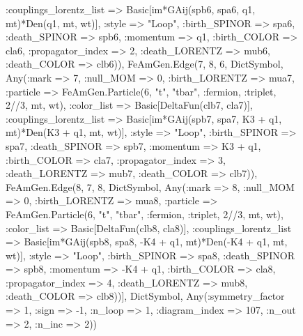 \documentclass{revtex4}
\begin{document}
\begin{figure}[!htb]
\begin{center}
{:couplings_lorentz_list => Basic[im*GAij(spb6, spa6, q1, mt)*Den(q1, mt, wt)], :style => "Loop", :birth_SPINOR => spa6, :death_SPINOR => spb6, :momentum => q1, :birth_COLOR => cla6, :propagator_index => 2, :death_LORENTZ => mub6, :death_COLOR => clb6)), FeAmGen.Edge(7, 8, 6, Dict{Symbol, Any}(:mark => 7, :null_MOM => 0, :birth_LORENTZ => mua7, :particle => FeAmGen.Particle(6, "t", "tbar", :fermion, :triplet, 2//3, mt, wt), :color_list => Basic[DeltaFun(clb7, cla7)], :couplings_lorentz_list => Basic[im*GAij(spb7, spa7, K3 + q1, mt)*Den(K3 + q1, mt, wt)], :style => "Loop", :birth_SPINOR => spa7, :death_SPINOR => spb7, :momentum => K3 + q1, :birth_COLOR => cla7, :propagator_index => 3, :death_LORENTZ => mub7, :death_COLOR => clb7)), FeAmGen.Edge(8, 7, 8, Dict{Symbol, Any}(:mark => 8, :null_MOM => 0, :birth_LORENTZ => mua8, :particle => FeAmGen.Particle(6, "t", "tbar", :fermion, :triplet, 2//3, mt, wt), :color_list => Basic[DeltaFun(clb8, cla8)], :couplings_lorentz_list => Basic[im*GAij(spb8, spa8, -K4 + q1, mt)*Den(-K4 + q1, mt, wt)], :style => "Loop", :birth_SPINOR => spa8, :death_SPINOR => spb8, :momentum => -K4 + q1, :birth_COLOR => cla8, :propagator_index => 4, :death_LORENTZ => mub8, :death_COLOR => clb8))], Dict{Symbol, Any}(:symmetry_factor => 1, :sign => -1, :n_loop => 1, :diagram_index => 107, :n_out => 2, :n_inc => 2)) 
}
\end{center}
\end{figure}
\end{document}
